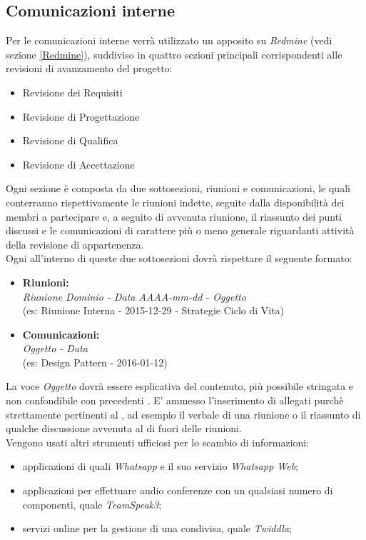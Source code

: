 \documentclass{scalatekids-article}
\begin{document}
\subsection{Comunicazioni interne}
Per le comunicazioni interne verrà utilizzato un  apposito su
\textit{Redmine} (vedi sezione \ref{Redmine}), suddiviso in quattro sezioni
principali corrispondenti alle revisioni di avanzamento del progetto:
\begin{itemize}
\item Revisione dei Requisiti
\item Revisione di Progettazione
\item Revisione di Qualifica
\item Revisione di Accettazione
\end{itemize}
Ogni sezione è composta da due sottosezioni, riunioni e comunicazioni, le quali
conterranno rispettivamente le riunioni indette, seguite dalla disponibilità dei
membri a partecipare e, a seguito di avvenuta riunione, il riassunto dei punti
discussi e le comunicazioni di carattere più o meno generale riguardanti
attività della revisione di appartenenza.\\ Ogni  all'interno di
queste due sottosezioni dovrà rispettare il seguente formato:
\begin{itemize}
\item\textbf{Riunioni:}\\
  \textit{Riunione Dominio - Data AAAA-mm-dd - Oggetto}\\
  (es: Riunione Interna - 2015-12-29 - Strategie Ciclo di Vita)
\item\textbf{Comunicazioni:}\\
  \textit{Oggetto - Data}\\
  (es: Design Pattern - 2016-01-12)
\end{itemize}
La voce \textit{Oggetto} dovrà essere esplicativa del contenuto, più possibile
stringata e non confondibile con precedenti . E' ammesso
l'inserimento di allegati purchè strettamente pertinenti al , ad
esempio il verbale di una riunione o il riassunto di qualche discussione
avvenuta al di fuori delle riunioni.\\
Vengono usati altri strumenti ufficiosi per lo scambio di informazioni:
\begin{itemize}
\item applicazioni di  quali \textit{Whatsapp} e il suo servizio \textit{Whatsapp Web};
\item applicazioni  per effettuare audio conferenze con un qualsiasi numero di componenti, quale \textit{TeamSpeak3};
\item servizi online per la gestione di una  condivisa, quale \textit{Twiddla};
\end{itemize}
\end{document}
